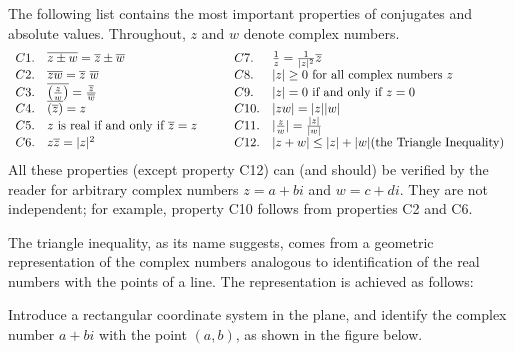 \documentclass{ximera}
\begin{document}
The following list contains the most important properties of conjugates and absolute values. Throughout, $z$ and $w$ denote complex numbers.
\begin{equation*}\label{eqn:complex_number_properties}
\begin{array}{llcll}
C1. & \overline{z \pm w} = \overline{z} \pm \overline{w} & \quad & C7. & \frac{1}{z} = \frac{1}{|z|^2}\overline{z} \\
C2. & \overline{zw} = \overline{z}~\overline{w} & \quad & C8. & |z| \geq 0 \mbox{ for all complex numbers } z \\
C3. & \overline{\left(\frac{z}{w}\right)} = \frac{\overline{z}}{\hspace{0.05em}\overline{w}\hspace{0.05em}} & \quad & C9. & |z| = 0 \mbox{ if and only if } z=0 \\
C4. & \overline{(\overline{z})} = z & \quad & C10. & |zw| = |z||w| \\
C5. & z \mbox{ is real if and only if } \overline{z} =z  & \quad & C11. & |\frac{z}{w}| = \frac{|z|}{|w|} \\
C6. & z\overline{z} = |z|^2 & \quad & C12. & |z+w| \leq |z|+|w| \mbox{(the Triangle Inequality)} \\
\end{array}
\end{equation*}
All these properties (except property C12) can (and should) be verified by the reader for arbitrary complex numbers $z = a + bi$ and $w = c + di$. They are not independent; for example, property C10 follows from properties C2 and C6.

The triangle inequality, as its name
suggests, comes from a geometric representation of the complex numbers
analogous to identification of the real numbers with the points of a
line. The representation is achieved as follows:



Introduce a rectangular coordinate system in the plane, and identify the complex number $a + bi$ with the point $(a, b)$, as shown in the figure below.
\begin{center}
\end{center}
\end{document}
